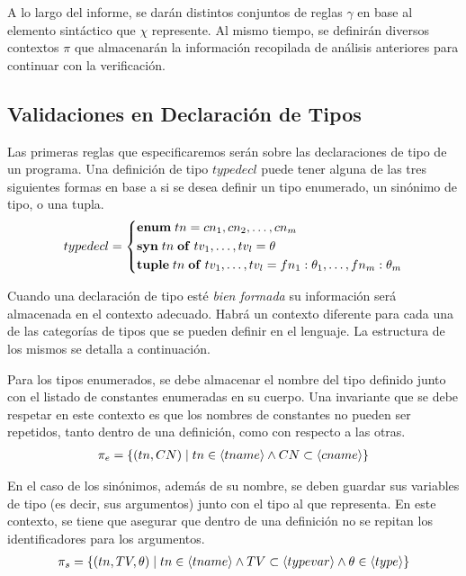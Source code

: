 \documentclass{article}
\begin{document}
A lo largo del informe, se darán distintos conjuntos de reglas $\gamma$ en base al elemento sintáctico que $\chi$ represente.
Al mismo tiempo, se definirán diversos contextos $\pi$ que almacenarán la información recopilada de análisis anteriores para continuar con la verificación.

\subsection{Validaciones en Declaración de Tipos}

Las primeras reglas que especificaremos serán sobre las declaraciones de tipo de un programa.
Una definición de tipo \textit{$typedecl$} puede tener alguna de las tres siguientes formas en base a si se desea definir un tipo enumerado, un sinónimo de tipo, o una tupla.
\begin{gather*}
typedecl =
\begin{cases*}
\T{enum} \; tn = cn_1, cn_2, \ldots, cn_m
\\
\T{syn} \; tn \; \T{of} \; tv_1, \ldots, tv_l = \theta
\\
\T{tuple} \; tn \; \T{of} \; tv_1, \ldots, tv_l = fn_1 : \theta_1, \ldots, fn_m : \theta_m
\end{cases*}
\end{gather*}

Cuando una declaración de tipo esté \textit{bien formada} su información será almacenada en el contexto adecuado.
Habrá un contexto diferente para cada una de las categorías de tipos que se pueden definir en el lenguaje.
La estructura de los mismos se detalla a continuación.

Para los tipos enumerados, se debe almacenar el nombre del tipo definido junto con el listado de constantes enumeradas en su cuerpo.
Una invariante que se debe respetar en este contexto es que los nombres de constantes no pueden ser repetidos, tanto dentro de una definición, como con respecto a las otras.
\begin{gather*}
\pi_{e} =
\{ 
(tn, CN) \mid 
tn \in \langle tname \rangle 
\wedge 
CN \subset \langle cname \rangle
\}
\end{gather*}

En el caso de los sinónimos, además de su nombre, se deben guardar sus variables de tipo (es decir, sus argumentos) junto con el tipo al que representa.
En este contexto, se tiene que asegurar que dentro de una definición no se repitan los identificadores para los argumentos.
\begin{gather*}
\pi_{s} =
\{
(tn, TV, \theta) \mid 
tn \in \langle tname \rangle
\wedge
TV \subset \langle typevar \rangle
\wedge
\theta \in \langle type \rangle
\}
\end{gather*}
\end{document}
